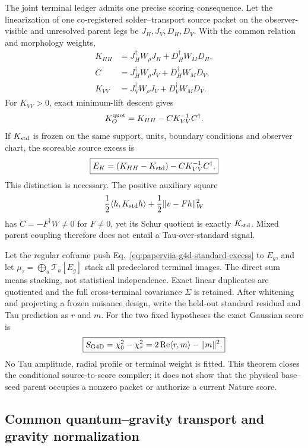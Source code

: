 \documentclass[11pt]{article}
\begin{document}
The joint terminal ledger admits one precise scoring consequence.  Let the
linearization of one co-registered solder--transport source packet on the
observer-visible and unresolved parent legs be
\(J_H,J_V,D_H,D_V\).  With the common relation and morphology weights,
\[
\begin{aligned}
K_{HH}&=J_H^\dagger W_\rho J_H+D_H^\dagger W_M D_H,\\
C&=J_H^\dagger W_\rho J_V+D_H^\dagger W_M D_V,\\
K_{VV}&=J_V^\dagger W_\rho J_V+D_V^\dagger W_M D_V.
\end{aligned}
\]
For \(K_{VV}>0\), exact minimum-lift descent gives
\[
 K_O^{\rm quot}=K_{HH}-CK_{VV}^{-1}C^\dagger.
\]
If \(K_{\rm std}\) is frozen on the same support, units, boundary conditions
and observer chart, the scoreable source excess is
\begin{equation}
 \boxed{E_K=(K_{HH}-K_{\rm std})-CK_{VV}^{-1}C^\dagger.}
 \label{eq:paperviia-g4d-standard-excess}
\end{equation}
This distinction is necessary.  The positive auxiliary square
\[
 \frac12\langle h,K_{\rm std}h\rangle+
 \frac12\|v-Fh\|_W^2
\]
has \(C=-F^\dagger W\neq0\) for \(F\neq0\), yet its Schur quotient is exactly
\(K_{\rm std}\).  Mixed parent coupling therefore does not entail a
Tau-over-standard signal.

Let the regular coframe push Eq.~\eqref{eq:paperviia-g4d-standard-excess} to
\(E_g\), and let \(\mu_\tau=\bigoplus_a\mathcal T_a[E_g]\) stack all
predeclared terminal images.  The direct sum means stacking, not statistical
independence.  Exact linear duplicates are quotiented and the full
cross-terminal covariance \(\Sigma\) is retained.  After whitening and
projecting a frozen nuisance design, write the held-out standard residual and
Tau prediction as \(r\) and \(m\).  For the two fixed hypotheses the exact
Gaussian score is
\begin{equation}
 \boxed{S_{\rm G4D}=\chi_0^2-\chi_\tau^2
 =2\operatorname{Re}\langle r,m\rangle-\|m\|^2.}
 \label{eq:paperviia-g4d-fixed-score}
\end{equation}
No Tau amplitude, radial profile or terminal weight is fitted.  This theorem
closes the conditional source-to-score compiler; it does not show that the
physical base--seed parent occupies a nonzero packet or authorize a current
Nature score.

\subsection*{Common quantum--gravity transport and gravity normalization}
\end{document}
